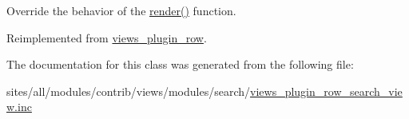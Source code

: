 Override the behavior of the \hyperlink{classviews__plugin__row__search__view_ec0c01f2e90075589b38f73381aa4ce7}{render()} function. 

Reimplemented from \hyperlink{classviews__plugin__row_8243842e087dd28664b32cef0309f2a6}{views\_\-plugin\_\-row}.

The documentation for this class was generated from the following file:\begin{CompactItemize}
\item 
sites/all/modules/contrib/views/modules/search/\hyperlink{views__plugin__row__search__view_8inc}{views\_\-plugin\_\-row\_\-search\_\-view.inc}\end{CompactItemize}
